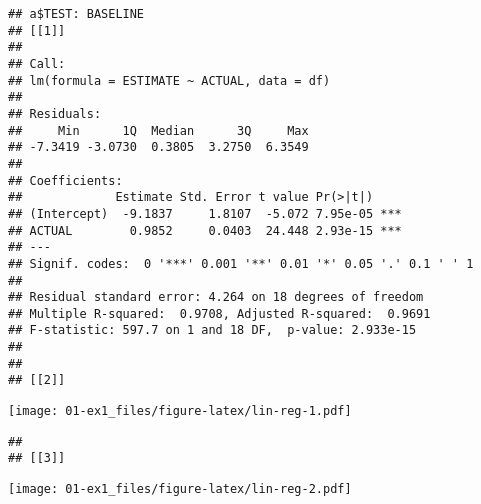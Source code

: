 \documentclass[]{book}
\newenvironment{Shaded}{\begin{snugshade}}{\end{snugshade}}
\newcommand{\AlertTok}[1]{\textcolor[rgb]{0.94,0.16,0.16}{#1}}
\newcommand{\CommentTok}[1]{\textcolor[rgb]{0.56,0.35,0.01}{\textit{#1}}}
\newcommand{\ControlFlowTok}[1]{\textcolor[rgb]{0.13,0.29,0.53}{\textbf{#1}}}
\newcommand{\DataTypeTok}[1]{\textcolor[rgb]{0.13,0.29,0.53}{#1}}
\newcommand{\KeywordTok}[1]{\textcolor[rgb]{0.13,0.29,0.53}{\textbf{#1}}}
\newcommand{\NormalTok}[1]{#1}
\newcommand{\OperatorTok}[1]{\textcolor[rgb]{0.81,0.36,0.00}{\textbf{#1}}}
\newcommand{\StringTok}[1]{\textcolor[rgb]{0.31,0.60,0.02}{#1}}
\begin{document}
\begin{Shaded}
\end{Shaded}

\begin{verbatim}
## a$TEST: BASELINE
## [[1]]
## 
## Call:
## lm(formula = ESTIMATE ~ ACTUAL, data = df)
## 
## Residuals:
##     Min      1Q  Median      3Q     Max 
## -7.3419 -3.0730  0.3805  3.2750  6.3549 
## 
## Coefficients:
##             Estimate Std. Error t value Pr(>|t|)    
## (Intercept)  -9.1837     1.8107  -5.072 7.95e-05 ***
## ACTUAL        0.9852     0.0403  24.448 2.93e-15 ***
## ---
## Signif. codes:  0 '***' 0.001 '**' 0.01 '*' 0.05 '.' 0.1 ' ' 1
## 
## Residual standard error: 4.264 on 18 degrees of freedom
## Multiple R-squared:  0.9708, Adjusted R-squared:  0.9691 
## F-statistic: 597.7 on 1 and 18 DF,  p-value: 2.933e-15
## 
## 
## [[2]]
\end{verbatim}

\texttt{[image: 01-ex1\_files/figure-latex/lin-reg-1.pdf]}

\begin{verbatim}
## 
## [[3]]
\end{verbatim}

\texttt{[image: 01-ex1\_files/figure-latex/lin-reg-2.pdf]}
\end{document}
